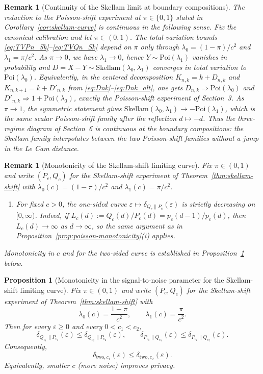 \documentclass{article}
\newtheorem{proposition}[theorem]{Proposition}
\newtheorem{remark}[theorem]{Remark}
\begin{document}
\begin{remark}[Continuity of the Skellam limit at boundary compositions]
\label{rem:skellam-boundary-continuity}
The reduction to the Poisson-shift experiment at $\pi\in\{0,1\}$ stated in Corollary~\ref{cor:skellam-curve}
is continuous in the following sense. Fix the canonical calibration and let $\pi\in(0,1)$.
The total-variation bounds \eqref{eq:TVPn_Sk}--\eqref{eq:TVQn_Sk} depend on $\pi$ only through
$\lambda_0=(1-\pi)/c^2$ and $\lambda_1=\pi/c^2$. As $\pi\to 0$, we have $\lambda_1\to 0$, hence
$Y\sim\mathrm{Poi}(\lambda_1)$ vanishes in probability and
$D=X-Y\sim\mathrm{Skellam}(\lambda_0,\lambda_1)$ converges in total variation to
$\mathrm{Poi}(\lambda_0)$. Equivalently, in the centered decomposition
$K_{n,k}=k+D_{n,k}$ and $K_{n,k+1}=k+D'_{n,k}$ from \eqref{eq:Dnk}--\eqref{eq:Dnk_alt}, one gets
$D_{n,k}\Rightarrow \mathrm{Poi}(\lambda_0)$ and $D'_{n,k}\Rightarrow 1+\mathrm{Poi}(\lambda_0)$, exactly the
Poisson-shift experiment of Section~3. As $\pi\to 1$, the symmetric statement gives
$\mathrm{Skellam}(\lambda_0,\lambda_1)\to -\mathrm{Poi}(\lambda_1)$, which is the same scalar
Poisson-shift family after the reflection $d\mapsto -d$. Thus the three-regime diagram of
Section~6 is continuous at the boundary compositions: the Skellam family interpolates between
the two Poisson-shift families without a jump in the Le Cam distance.
\end{remark}

\begin{remark}[Monotonicity of the Skellam-shift limiting curve]
Fix $\pi \in (0,1)$ and write $(P_c, Q_c)$ for the Skellam-shift experiment of Theorem~\ref{thm:skellam-shift} with $\lambda_0(c) = (1-\pi)/c^2$ and $\lambda_1(c) = \pi/c^2$.
\begin{enumerate}
\item[(i)] For fixed $c > 0$, the one-sided curve $\varepsilon \mapsto \delta_{Q_c\|P_c}(\varepsilon)$ is strictly decreasing on $[0,\infty)$. Indeed, if
$L_c(d) := Q_c(d)/P_c(d) = p_c(d-1)/p_c(d)$, then $L_c(d) \to \infty$ as $d \to \infty$, so the same argument
as in Proposition~\ref{prop:poisson-monotonicity}(i) applies.
\end{enumerate}
Monotonicity in $c$ and for the two-sided curve is established in Proposition~\ref{prop:skellam-monotonicity} below.
\end{remark}

\begin{proposition}[Monotonicity in the signal-to-noise parameter for the Skellam-shift limiting curve]
\label{prop:skellam-monotonicity}
Fix $\pi\in(0,1)$ and write $(P_c,Q_c)$ for the Skellam-shift experiment of Theorem~\ref{thm:skellam-shift} with
\[
\lambda_0(c)=\frac{1-\pi}{c^2},\qquad \lambda_1(c)=\frac{\pi}{c^2}.
\]
Then for every $\varepsilon\ge 0$ and every $0<c_1<c_2$,
\[
\delta_{Q_{c_1}\|P_{c_1}}(\varepsilon)\le \delta_{Q_{c_2}\|P_{c_2}}(\varepsilon),
\qquad
\delta_{P_{c_1}\|Q_{c_1}}(\varepsilon)\le \delta_{P_{c_2}\|Q_{c_2}}(\varepsilon).
\]
Consequently,
\[
\delta_{\mathrm{two},c_1}(\varepsilon)\le \delta_{\mathrm{two},c_2}(\varepsilon).
\]
Equivalently, smaller $c$ (more noise) improves privacy.
\end{proposition}
\end{document}

